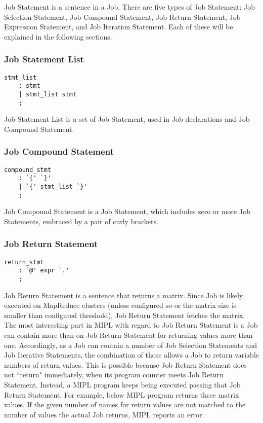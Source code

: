 \documentclass[prodmode,acmtecs]{acmsmall}
\begin{document}
Job Statement is a sentence in a Job.  There are five types of
Job Statement: Job Selection Statement, Job Compound Statement,
Job Return Statement, Job Expression Statement, and Job Iteration
Statement.  Each of these will be explained in the following
sections.
\medskip

\subsubsection{Job Statement List}

\begin{lstlisting}
stmt_list
	: stmt
	| stmt_list stmt
	;
\end{lstlisting}

Job Statement List is a set of Job Statement, used in Job
declarations and Job Compound Statement.
\medskip


\subsubsection{Job Compound Statement}

\begin{lstlisting}
compound_stmt
	: `{' `}'
	| `{' stmt_list `}'
	;
\end{lstlisting}

Job Compound Statement is a Job Statement, which includes
zero or more Job Statements, embraced by a pair of curly
brackets.
\medskip

\subsubsection{Job Return Statement}

\begin{lstlisting}
return_stmt
	: `@' expr `.'
	;

\end{lstlisting}

Job Return Statement is a sentence that returns a matrix.  Since
Job is likely executed on MapReduce clusters (unless configured
so or the matrix size is smaller than configured threshold), Job
Return Statement fetches the matrix.  The most interesting part
in MIPL with regard to Job Return Statement is a Job can contain
more than on Job Return Statement for returning values more than
one.  Accordingly, as a Job can contain a number of Job Selection
Statements and Job Iterative Statements, the combination of those
allows a Job to return variable numbers of return values. This is
possible because Job Return Statement does not ``return" immediately,
when its program counter meets Job Return Statement.  Instead, a
MIPL program keeps being executed passing that Job Return Statement.
For example, below MIPL program returns three matrix values.  If
the given number of names for return values are not matched to the
number of values the actual Job returns, MIPL reports an error.
\end{document}
